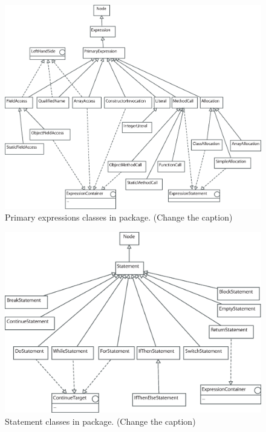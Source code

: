 \begin{figure}[!htb]
\begin{center}
\includegraphics[width=\textwidth]{images/primaryexpressions.eps}
\caption{Primary expressions classes in  package. (Change the caption)}
\label{fig:primary_expression_classes}
\end{center}
\end{figure}

\begin{figure}[!htb]
\begin{center}
\includegraphics[width=\textwidth]{images/statements.eps}
\caption{Statement classes in  package. (Change the caption)}
\label{fig:statement_classes}
\end{center}
\end{figure}


